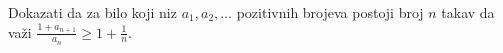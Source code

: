 \problem{}
Dokazati da za bilo koji niz $a_1, a_2, \ldots$ pozitivnih brojeva postoji broj $n$ takav da važi $\frac{1 + a_{n+1}}{a_n} \geq 1 + \frac{1}{n}$.
\solution
\endproblem
